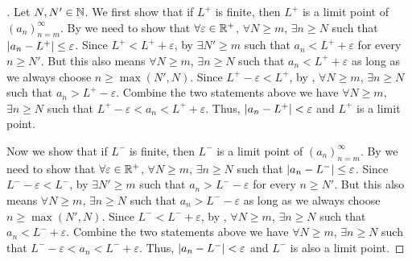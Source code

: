 \begin{proof}[]
  Let \(N, N' \in \mathbb{N}\).
  We first show that if \(L^+\) is finite, then \(L^+\) is a limit point of \((a_n)_{n = m}^\infty\).
  By  we need to show that \(\forall \varepsilon \in \mathbb{R}^+\), \(\forall N \geq m\), \(\exists n \geq N\) such that \(\left\lvert a_n - L^+\right\rvert \leq \varepsilon\).
  Since \(L^+ < L^+ + \varepsilon\), by  \(\exists N' \geq m\) such that \(a_n < L^+ + \varepsilon\) for every \(n \geq N'\).
  But this also means \(\forall N \geq m\), \(\exists n \geq N\) such that \(a_n < L^+ + \varepsilon\) as long as we always choose \(n \geq \max(N', N)\).
  Since \(L^+ - \varepsilon < L^+\), by , \(\forall N \geq m\), \(\exists n \geq N\) such that \(a_n > L^+ - \varepsilon\).
  Combine the two statements above we have \(\forall N \geq m\), \(\exists n \geq N\) such that \(L^+ - \varepsilon < a_n < L^+ + \varepsilon\).
  Thus, \(\left\lvert a_n - L^+\right\rvert < \varepsilon\) and \(L^+\) is a limit point.

  Now we show that if \(L^-\) is finite, then \(L^-\) is a limit point of \((a_n)_{n = m}^\infty\).
  By  we need to show that \(\forall \varepsilon \in \mathbb{R}^+\), \(\forall N \geq m\), \(\exists n \geq N\) such that \(\left\lvert a_n - L^-\right\rvert \leq \varepsilon\).
  Since \(L^- - \varepsilon < L^-\), by  \(\exists N' \geq m\) such that \(a_n > L^- - \varepsilon\) for every \(n \geq N'\).
  But this also means \(\forall N \geq m\), \(\exists n \geq N\) such that \(a_n > L^- - \varepsilon\) as long as we always choose \(n \geq \max(N', N)\).
  Since \(L^- < L^- + \varepsilon\), by , \(\forall N \geq m\), \(\exists n \geq N\) such that \(a_n < L^- + \varepsilon\).
  Combine the two statements above we have \(\forall N \geq m\), \(\exists n \geq N\) such that \(L^- - \varepsilon < a_n < L^- + \varepsilon\).
  Thus, \(\left\lvert a_n - L^-\right\rvert < \varepsilon\) and \(L^-\) is also a limit point.
\end{proof}

